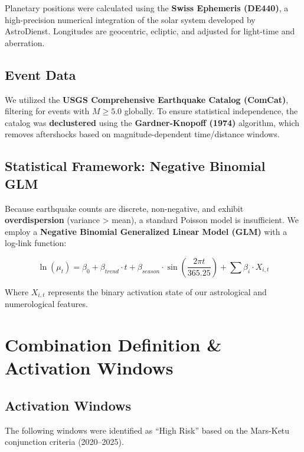\documentclass[
  11pt,
  a4paper,
  oneside,
  openany]{article}
\begin{document}
Planetary positions were calculated using the \textbf{Swiss Ephemeris
(DE440)}, a high-precision numerical integration of the solar system
developed by AstroDienst. Longitudes are geocentric, ecliptic, and
adjusted for light-time and aberration.

\subsection{Event Data}\label{event-data}

We utilized the \textbf{USGS Comprehensive Earthquake Catalog (ComCat)},
filtering for events with \(M \ge 5.0\) globally. To ensure statistical
independence, the catalog was \textbf{declustered} using the
\textbf{Gardner-Knopoff (1974)} algorithm, which removes aftershocks
based on magnitude-dependent time/distance windows.

\subsection{Statistical Framework: Negative Binomial
GLM}\label{statistical-framework-negative-binomial-glm}

Because earthquake counts are discrete, non-negative, and exhibit
\textbf{overdispersion} (variance \textgreater{} mean), a standard
Poisson model is insufficient. We employ a \textbf{Negative Binomial
Generalized Linear Model (GLM)} with a log-link function:

\[ \ln(\mu_t) = \beta_0 + \beta_{trend} \cdot t + \beta_{season} \cdot \sin\left(\frac{2\pi t}{365.25}\right) + \sum \beta_i \cdot X_{i,t} \]

Where \(X_{i,t}\) represents the binary activation state of our
astrological and numerological features.

\section{Combination Definition \& Activation
Windows}\label{combination-definition-activation-windows}

\subsection{Activation Windows}\label{activation-windows}

The following windows were identified as ``High Risk'' based on the
Mars-Ketu conjunction criteria (2020--2025).
\end{document}
